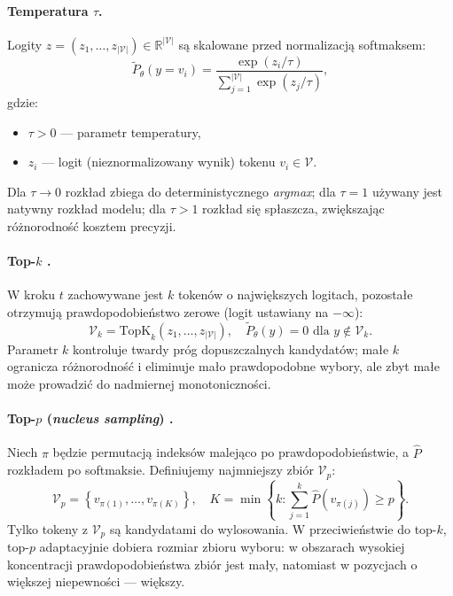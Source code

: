 \documentclass[12pt,a4paper]{article}
\begin{document}
\paragraph{Temperatura $\tau$.}
Logity $z = (z_1,\dots,z_{|\mathcal{V}|}) \in \mathbb{R}^{|\mathcal{V}|}$ są skalowane przed normalizacją softmaksem:
\begin{equation}
\tilde P_\theta(y = v_i) = \frac{\exp(z_i / \tau)}{\sum_{j=1}^{|\mathcal{V}|} \exp(z_j / \tau)},
\end{equation}
gdzie:
\begin{itemize}[leftmargin=1.5em]
    \item $\tau > 0$ --- parametr temperatury,
    \item $z_i$ --- logit (nieznormalizowany wynik) tokenu $v_i \in \mathcal{V}$.
\end{itemize}
Dla $\tau \to 0$ rozkład zbiega do deterministycznego \textit{argmax}; dla $\tau = 1$ używany jest natywny rozkład modelu; dla $\tau > 1$ rozkład się spłaszcza, zwiększając różnorodność kosztem precyzji.

\paragraph{Top-$k$ \citep{fan2018topk}.}
W kroku $t$ zachowywane jest $k$ tokenów o największych logitach, pozostałe otrzymują prawdopodobieństwo zerowe (logit ustawiany na $-\infty$):
\begin{equation}
\mathcal{V}_k = \mathrm{TopK}_k\!\left(z_1,\dots,z_{|\mathcal{V}|}\right), \quad
\tilde P_\theta(y) = 0 \text{ dla } y \notin \mathcal{V}_k.
\end{equation}
Parametr $k$ kontroluje twardy próg dopuszczalnych kandydatów; małe $k$ ogranicza różnorodność i eliminuje mało prawdopodobne wybory, ale zbyt małe może prowadzić do nadmiernej monotoniczności.

\paragraph{Top-$p$ (\textit{nucleus sampling}) \citep{holtzman2020nucleus}.}
Niech $\pi$ będzie permutacją indeksów malejąco po prawdopodobieństwie, a $\hat P$ rozkładem po softmaksie. Definiujemy najmniejszy zbiór $\mathcal{V}_p$:
\begin{equation}
\mathcal{V}_p = \left\{ v_{\pi(1)},\dots,v_{\pi(K)} \right\},\quad
K = \min \left\{ k : \sum_{j=1}^{k} \hat P\!\left(v_{\pi(j)}\right) \ge p \right\}.
\end{equation}
Tylko tokeny z $\mathcal{V}_p$ są kandydatami do wylosowania. W przeciwieństwie do top-$k$, top-$p$ adaptacyjnie dobiera rozmiar zbioru wyboru: w obszarach wysokiej koncentracji prawdopodobieństwa zbiór jest mały, natomiast w pozycjach o większej niepewności --- większy.
\end{document}
